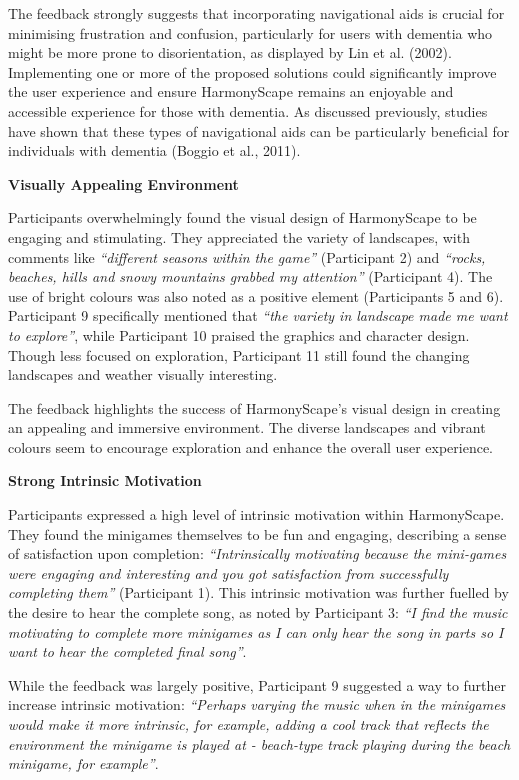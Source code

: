 \documentclass{l4proj}
\begin{document}
The feedback strongly suggests that incorporating navigational aids is crucial for minimising frustration and confusion, particularly for users with dementia who might be more prone to disorientation, as displayed by Lin et al. (2002). Implementing one or more of the proposed solutions could significantly improve the user experience and ensure HarmonyScape remains an enjoyable and accessible experience for those with dementia. As discussed previously, studies have shown that these types of navigational aids can be particularly beneficial for individuals with dementia (Boggio et al., 2011).
\newline

\textbf{Visually Appealing Environment}

Participants overwhelmingly found the visual design of HarmonyScape to be engaging and stimulating. They appreciated the variety of landscapes, with comments like \emph{“different seasons within the game”} (Participant 2) and \emph{“rocks, beaches, hills and snowy mountains grabbed my attention”} (Participant 4). The use of bright colours was also noted as a positive element (Participants 5 and 6).  Participant 9 specifically mentioned that \emph{“the variety in landscape made me want to explore”}, while Participant 10 praised the graphics and character design. Though less focused on exploration, Participant 11 still found the changing landscapes and weather visually interesting.

The feedback highlights the success of HarmonyScape's visual design in creating an appealing and immersive environment. The diverse landscapes and vibrant colours seem to encourage exploration and enhance the overall user experience.
\newline

\textbf{Strong Intrinsic Motivation}

Participants expressed a high level of intrinsic motivation within HarmonyScape. They found the minigames themselves to be fun and engaging, describing a sense of satisfaction upon completion: \emph{“Intrinsically motivating because the mini-games were engaging and interesting and you got satisfaction from successfully completing them”} (Participant 1). This intrinsic motivation was further fuelled by the desire to hear the complete song, as noted by Participant 3: \emph{“I find the music motivating to complete more minigames as I can only hear the song in parts so I want to hear the completed final song”}.

While the feedback was largely positive, Participant 9 suggested a way to further increase intrinsic motivation: \emph{“Perhaps varying the music when in the minigames would make it more intrinsic, for example, adding a cool track that reflects the environment the minigame is played at - beach-type track playing during the beach minigame, for example”}.
\end{document}
